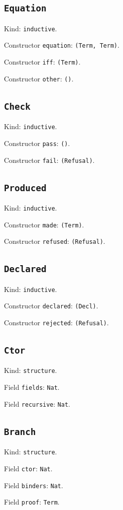 \documentclass[11pt]{article}
\begin{document}
\subsection*{\texttt{Equation}}
\noindent Kind: \texttt{inductive}.\par
\noindent Constructor \texttt{equation}: \texttt{(Term, Term)}.\par
\noindent Constructor \texttt{iff}: \texttt{(Term)}.\par
\noindent Constructor \texttt{other}: \texttt{()}.\par
\subsection*{\texttt{Check}}
\noindent Kind: \texttt{inductive}.\par
\noindent Constructor \texttt{pass}: \texttt{()}.\par
\noindent Constructor \texttt{fail}: \texttt{(Refusal)}.\par
\subsection*{\texttt{Produced}}
\noindent Kind: \texttt{inductive}.\par
\noindent Constructor \texttt{made}: \texttt{(Term)}.\par
\noindent Constructor \texttt{refused}: \texttt{(Refusal)}.\par
\subsection*{\texttt{Declared}}
\noindent Kind: \texttt{inductive}.\par
\noindent Constructor \texttt{declared}: \texttt{(Decl)}.\par
\noindent Constructor \texttt{rejected}: \texttt{(Refusal)}.\par
\subsection*{\texttt{Ctor}}
\noindent Kind: \texttt{structure}.\par
\noindent Field \texttt{fields}: \texttt{Nat}.\par
\noindent Field \texttt{recursive}: \texttt{Nat}.\par
\subsection*{\texttt{Branch}}
\noindent Kind: \texttt{structure}.\par
\noindent Field \texttt{ctor}: \texttt{Nat}.\par
\noindent Field \texttt{binders}: \texttt{Nat}.\par
\noindent Field \texttt{proof}: \texttt{Term}.\par
\end{document}

